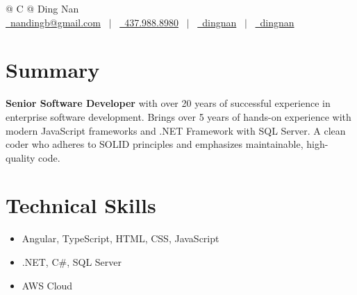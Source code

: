 \documentclass[a4paper,12pt]{article}
\begin{document}
\pagestyle{empty} 



\begin{tabularx}{\linewidth}{@{} C @{}}
\Huge{Ding Nan} \\[7.5pt]
\href{mailto:nandingb@gmail.com}{\raisebox{-0.05\height}\faEnvelope \ nandingb@gmail.com} \ $|$ \ 
\href{tel:+4379888980}{\raisebox{-0.05\height}\faMobile \ 437.988.8980} \ $|$ \ 
\href{https://github.com/dingnan}{\raisebox{-0.05\height}\faGithub\ dingnan} \ $|$ \ 
\href{https://www.linkedin.com/in/dingnan/}{\raisebox{-0.05\height}\faLinkedin\ dingnan} \\
\end{tabularx}


\section{Summary}
\textbf{Senior Software Developer} with over 20 years of successful experience in enterprise software development. Brings over 5 years of hands-on experience with modern JavaScript frameworks and .NET Framework with SQL Server. A clean coder who adheres to SOLID principles and emphasizes maintainable, high-quality code.

\section{Technical Skills}
\begin{itemize}[nosep,after=\strut, leftmargin=1em, itemsep=3pt,label=--]
\item Angular, TypeScript, HTML, CSS, JavaScript
\item .NET, C\#, SQL Server
\item AWS Cloud
\end{itemize}
\end{document}
